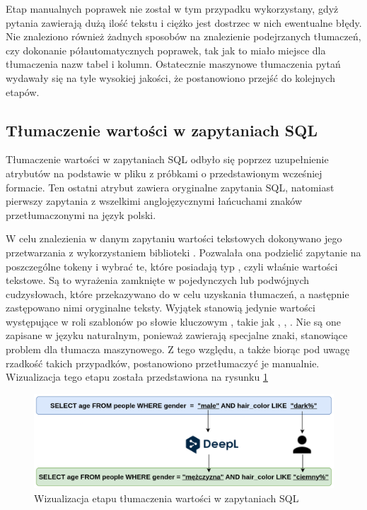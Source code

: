 Etap manualnych poprawek nie został w tym przypadku wykorzystany, gdyż pytania zawierają dużą ilość tekstu i ciężko jest dostrzec w nich ewentualne błędy. Nie znaleziono również żadnych sposobów na znalezienie podejrzanych tłumaczeń, czy dokonanie półautomatycznych poprawek, tak jak to miało miejsce dla tłumaczenia nazw tabel i kolumn. Ostatecznie maszynowe tłumaczenia pytań wydawały się na tyle wysokiej jakości, że postanowiono przejść do kolejnych etapów.

\subsection{Tłumaczenie wartości w zapytaniach SQL}
Tłumaczenie wartości w zapytaniach SQL odbyło się poprzez uzupełnienie atrybutów  na podstawie  w pliku z próbkami o przedstawionym wcześniej formacie. Ten ostatni atrybut zawiera oryginalne zapytania SQL, natomiast pierwszy zapytania z wszelkimi anglojęzycznymi łańcuchami znaków przetłumaczonymi na język polski.

W celu znalezienia w danym zapytaniu wartości tekstowych dokonywano jego przetwarzania z wykorzystaniem biblioteki . Pozwalała ona podzielić zapytanie na poszczególne tokeny i wybrać te, które posiadają typ , czyli właśnie wartości tekstowe. Są to wyrażenia zamknięte w pojedynczych lub podwójnych cudzysłowach, które przekazywano do  w celu uzyskania tłumaczeń, a następnie zastępowano nimi oryginalne teksty. Wyjątek stanowią jedynie wartości występujące w roli szablonów po słowie kluczowym , takie jak , , . Nie są one zapisane w języku naturalnym, ponieważ zawierają specjalne znaki, stanowiące problem dla tłumacza maszynowego. Z tego względu, a także biorąc pod uwagę rzadkość takich przypadków, postanowiono przetłumaczyć je manualnie. Wizualizacja tego etapu została przedstawiona na rysunku \ref{fig:value-translation}

\begin{figure}[ht!]
  \centering
  \includegraphics[width=1.0\linewidth]{images/value_translation.png}
  \caption{Wizualizacja etapu tłumaczenia wartości w zapytaniach SQL}
  \label{fig:value-translation}
\end{figure}

